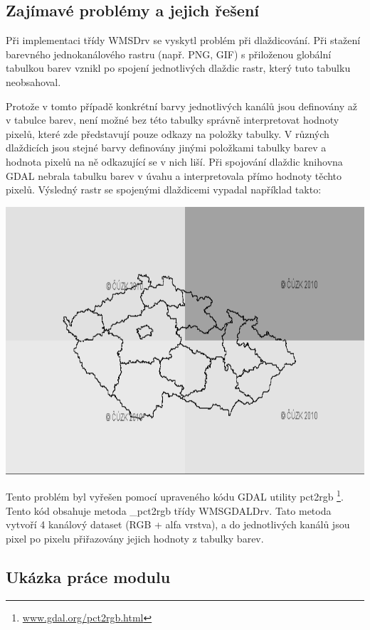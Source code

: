 \documentclass[a4paper,12pt]{article}
\begin{document}
\subsection{Zajímavé problémy a jejich řešení}

Při implementaci třídy WMSDrv se vyskytl problém při dlaždicování.
Při stažení barevného jednokanálového rastru (např. PNG, GIF) s přiloženou globální tabulkou barev vznikl po spojení jednotlivých dlaždic rastr, který tuto tabulku neobsahoval.

Protože v tomto případě konkrétní barvy jednotlivých kanálů jsou definovány až v tabulce barev, není možné bez této tabulky správně interpretovat hodnoty pixelů, které  zde představují pouze odkazy na položky tabulky. V různých dlaždicích jsou stejné barvy definovány jinými položkami tabulky barev a hodnota pixelů na ně odkazující se v nich liší. 
Při spojování dlaždic knihovna GDAL nebrala tabulku barev v úvahu a interpretovala přímo hodnoty těchto pixelů. Výsledný rastr se spojenými dlaždicemi vypadal například takto: 

 \includegraphics[scale=0.4]{figures/color_table_problem.png}



Tento problém byl vyřešen pomocí upraveného kódu GDAL utility pct2rgb \footnote{\url{www.gdal.org/pct2rgb.html}}. Tento kód obsahuje metoda \_pct2rgb třídy  WMSGDALDrv.
Tato metoda vytvoří 4 kanálový dataset (RGB + alfa vrstva), a do jednotlivých kanálů jsou pixel po pixelu přiřazovány jejich hodnoty z tabulky barev. 

\subsection{Ukázka práce modulu}
\end{document}
